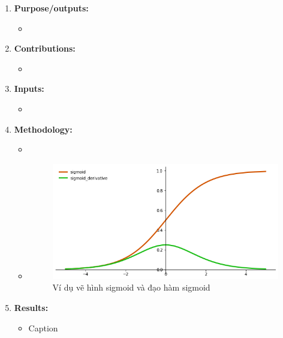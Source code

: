 \documentclass[11pt]{article}
\begin{document}
\begin{enumerate}
    \item
    \textbf{Purpose/outputs:}
    \begin{itemize}
        \item \blindtext[0]
    \end{itemize}
    
    \item
    \textbf{Contributions:}
    \begin{itemize}
        \item \blindtext[0]
    \end{itemize}
    
    \item
    \textbf{Inputs:}
    \begin{itemize}
        \item \blindtext[0]
    \end{itemize}
    
    \item
    \textbf{Methodology:}
    \begin{itemize}
        \item \blindtext[0]
        \item \blindtext[0]
        \begin{figure}[!h]
            \centering
            \includegraphics[scale=0.7]{imgs/P1_sigmoid.png}
            \caption{Ví dụ vẽ hình sigmoid và đạo hàm sigmoid}
            \label{fig:P1_sig}
        \end{figure}
    \end{itemize}
    
    \item
    \textbf{Results:}
    \begin{itemize}
        \item \blindtext[0]
        \begin{table}[h]
            \begin{center}
            \caption{Caption}\label{tab:2}
            

\end{center}
\end{table}
\end{itemize}
\end{enumerate}
\end{document}
